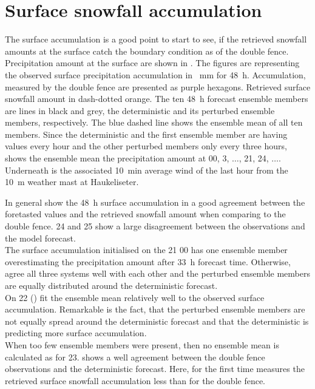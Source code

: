 \section{Surface snowfall accumulation}
The surface accumulation is a good point to start to see, if the retrieved snowfall amounts at the surface catch the boundary condition as of the double fence. Precipitation amount at the surface are shown in . The figures are representing the observed surface precipitation accumulation in \SI{}{\mm} for \SI{48}{\hour}. Accumulation, measured by the double fence are presented as purple hexagons. Retrieved surface snowfall amount in dash-dotted orange. The ten \SI{48}{\hour} forecast ensemble members are lines in black and grey, the deterministic and its perturbed ensemble members, respectively. The blue dashed line shows the ensemble mean of all ten members. Since the deterministic and the first ensemble member are having values every hour and the other perturbed members only every three hours, shows the ensemble mean the precipitation amount at 0\SI{0}{\UTC}, \SI{3}{\UTC}, $\ldots$, \SI{21}{\UTC}, \SI{24}{\UTC}, $\ldots$. 
Underneath is the associated \SI{10}{\minute} average wind of the last hour from the \SI{10}{\metre} weather mast at Haukeliseter. 

\noindent
In general show the \SI{48}{\hour} surface accumulation in  a good agreement between the foretasted values and the retrieved snowfall amount when comparing to the double fence. \SI{24}{\dec} and \SI{25}{\dec} show a large disagreement between the observations and the model forecast. \\
The surface accumulation initialised on the \SI{21}{\dec} 0\SI{0}{\UTC} has one ensemble member overestimating the precipitation amount after \SI{33}{\hour} forecast time. Otherwise, agree all three systems well with each other and the perturbed ensemble members are equally distributed around the deterministic forecast.
\\
On \SI{22}{\dec} () fit the ensemble mean relatively well to the observed surface accumulation. Remarkable is the fact, that the perturbed ensemble members are not equally spread around the deterministic forecast and that the deterministic is predicting more surface accumulation. 
\\
When too few ensemble members were present, then no ensemble mean is calculated as for \SI{23}{\dec}.  shows a well agreement between the double fence observations and the deterministic forecast. Here, for the first time measures the retrieved surface snowfall accumulation less than for the double fence.
